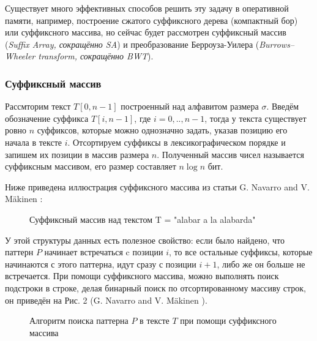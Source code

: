 \documentclass[a4paper,12pt]{article}
\begin{document}
Существует много эффективных способов решить эту задачу в оперативной памяти, например, построение сжатого суффиксного дерева (компактный бор) или суффиксного массива, но сейчас будет рассмотрен суффиксный массив (\textit{Suffix Array, сокращённо SA}) и преобразование Берроуза-Уилера (\textit{Burrows–Wheeler transform, сокращённо BWT}).

\subsubsection{Суффиксный массив}
Рассмторим текст $T[0, n-1]$ построенный над алфавитом размера $\sigma$. Введём обозначение суффикса $T[i, n-1]$, где $i=0,..,n-1$, тогда у текста существует ровно $n$ суффиксов, которые можно однозначно задать, указав позицию его начала в тексте $i$. Отсортируем суффиксы в лексикографическом порядке и запишем их позиции в массив размера $n$. Полученный массив чисел называется суффиксным массивом, его размер составляет $n\log{n}$ бит.

Ниже приведена иллюстрация суффиксного массива из статьи G. Navarro and V. Mäkinen \cite{navarro2007compressed}:

\begin{figure}[h!]
\caption{Суффиксный массив над текстом T = "alabar a la alabarda"}
\end{figure}

У этой структуры данных есть полезное свойство: если было найдено, что паттерн $P$ начинает встречаться c позиции $i$, то все остальные суффиксы, которые начинаются с этого паттерна, идут сразу с позиции $i+1$, либо же он больше не встречается. 
При помощи суффиксного массива, можно выполнять поиск подстроки в строке, делая бинарный поиск по отсортированному массиву строк, он приведён на Рис. 2 (G. Navarro and V. Mäkinen \cite{navarro2007compressed}).

\begin{figure}[h!]
\caption{Алгоритм поиска паттерна $P$ в тексте $T$ при помощи суффиксного массива}
\end{figure}
\end{document}
